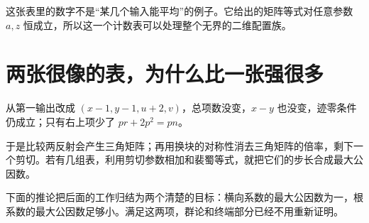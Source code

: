 这张表里的数字不是“某几个输入能平均”的例子。它给出的矩阵等式对任意参数 $a,z$ 恒成立，所以这一个计数表可以处理整个无界的二维配置族。

\section{两张很像的表，为什么比一张强很多}
从第一输出改成 $(x-1,y-1,u+2,v)$，总项数没变，$x-y$ 也没变，迹零条件仍成立；只有右上项少了 $pr+2p^2=pn$。

于是比较两反射会产生三角矩阵；再用换块的对称性消去三角矩阵的倍率，剩下一个剪切。若有几组表，利用剪切参数相加和裴蜀等式，就把它们的步长合成最大公因数。

下面的推论把后面的工作归结为两个清楚的目标：横向系数的最大公因数为一，根系数的最大公因数足够小。满足这两项，群论和终端部分已经不用重新证明。

